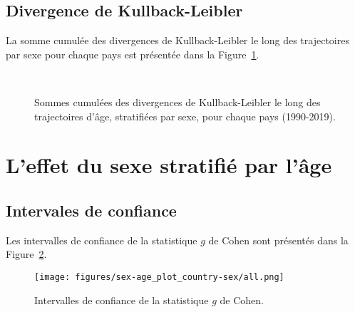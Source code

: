 \subsection{Divergence de Kullback-Leibler}
La somme cumulée des divergences de Kullback-Leibler le long des trajectoires par sexe pour chaque pays est présentée dans la Figure~\ref{fig:age-sex_KL_cumulative}.
\begin{figure}[H]
	\centering
	\\
	\caption{Sommes cumulées des divergences de Kullback-Leibler le long des trajectoires d'âge, stratifiées par sexe, pour chaque pays (1990-2019).}
	\label{fig:age-sex_KL_cumulative}
\end{figure}

\section{L'effet du sexe stratifié par l'âge}

\subsection{Intervales de confiance}
Les intervalles de confiance de la statistique \(g\) de Cohen sont présentés dans la Figure~\ref{fig:sex-age_plot_country-sex}.
\begin{figure}[H]
	\centering
	\texttt{[image: figures/sex-age\_plot\_country-sex/all.png]}
	\caption{Intervalles de confiance de la statistique \(g\) de Cohen.}
	\label{fig:sex-age_plot_country-sex}
\end{figure}


